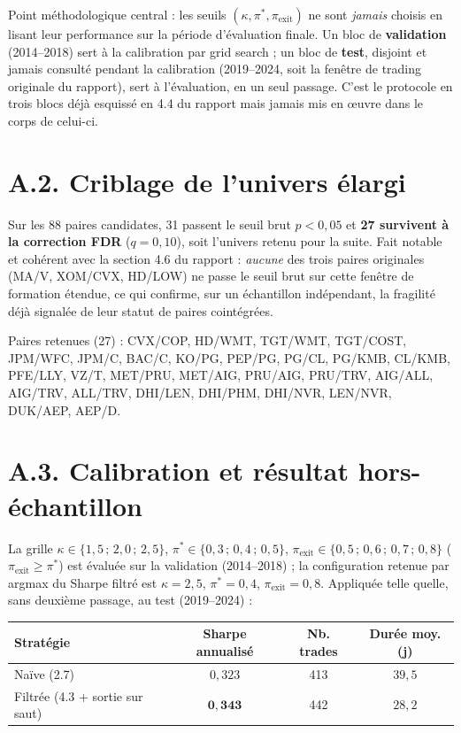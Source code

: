 \documentclass{article}
\begin{document}
Point méthodologique central : les seuils $(\kappa, \pi^\ast, \pi_{\text{exit}})$ ne sont \emph{jamais} choisis en lisant leur performance sur la période d'évaluation finale. Un bloc de \textbf{validation} (2014--2018) sert à la calibration par grid search ; un bloc de \textbf{test}, disjoint et jamais consulté pendant la calibration (2019--2024, soit la fenêtre de trading originale du rapport), sert à l'évaluation, en un seul passage. C'est le protocole en trois blocs déjà esquissé en 4.4 du rapport mais jamais mis en \oe uvre dans le corps de celui-ci.

\section*{A.2. Criblage de l'univers élargi}
Sur les 88 paires candidates, 31 passent le seuil brut $p<0{,}05$ et \textbf{27 survivent à la correction FDR} ($q=0{,}10$), soit l'univers retenu pour la suite. Fait notable et cohérent avec la section 4.6 du rapport : \emph{aucune} des trois paires originales (MA/V, XOM/CVX, HD/LOW) ne passe le seuil brut sur cette fenêtre de formation étendue, ce qui confirme, sur un échantillon indépendant, la fragilité déjà signalée de leur statut de paires cointégrées.

Paires retenues (27) : CVX/COP, HD/WMT, TGT/WMT, TGT/COST, JPM/WFC, JPM/C, BAC/C, KO/PG, PEP/PG, PG/CL, PG/KMB, CL/KMB, PFE/LLY, VZ/T, MET/PRU, MET/AIG, PRU/AIG, PRU/TRV, AIG/ALL, AIG/TRV, ALL/TRV, DHI/LEN, DHI/PHM, DHI/NVR, LEN/NVR, DUK/AEP, AEP/D.

\section*{A.3. Calibration et résultat hors-échantillon}
La grille $\kappa \in \{1{,}5\,;\,2{,}0\,;\,2{,}5\}$, $\pi^\ast \in \{0{,}3\,;\,0{,}4\,;\,0{,}5\}$, $\pi_{\text{exit}} \in \{0{,}5\,;\,0{,}6\,;\,0{,}7\,;\,0{,}8\}$ ($\pi_{\text{exit}} \geq \pi^\ast$) est évaluée sur la validation (2014--2018) ; la configuration retenue par argmax du Sharpe filtré est $\kappa=2{,}5$, $\pi^\ast=0{,}4$, $\pi_{\text{exit}}=0{,}8$. Appliquée telle quelle, sans deuxième passage, au test (2019--2024) :

\begin{center}
\begin{tabular}{lccc}
\toprule
Stratégie & Sharpe annualisé & Nb. trades & Durée moy. (j) \\
\midrule
Naïve (2.7) & $0{,}323$ & 413 & $39{,}5$ \\
Filtrée (4.3 + sortie sur saut) & $\mathbf{0{,}343}$ & 442 & $28{,}2$ \\
\bottomrule
\end{tabular}
\end{center}
\end{document}
